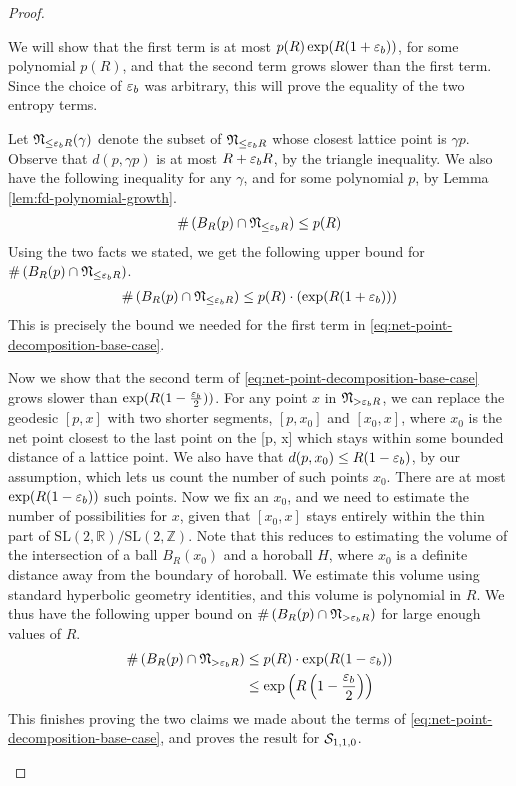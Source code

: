 \begin{proof}
\begin{itemize}
    We will show that the first term is at most $p(R) \exp(R(1 + \varepsilon_b))$, for some polynomial $p(R)$, and that the second term grows slower than the first term.
    Since the choice of $\varepsilon_b$ was arbitrary, this will prove the equality of the two entropy terms.

    Let $\mathfrak{N}_{\leq \varepsilon_b R}(\gamma)$ denote the subset of $\mathfrak{N}_{\leq \varepsilon_b R}$ whose closest lattice point is $\gamma p$.
    Observe that $d(p, \gamma p)$ is at most $R + \varepsilon_b R$, by the triangle inequality.
    We also have the following inequality for any $\gamma$, and for some polynomial $p$, by Lemma \ref{lem:fd-polynomial-growth}.
    \begin{align*}
      \#\left( B_R(p) \cap \mathfrak{N}_{\leq \varepsilon_b R} \right) \leq p(R)
    \end{align*}
    Using the two facts we stated, we get the following upper bound for $\#\left( B_R(p) \cap \mathfrak{N}_{\leq \varepsilon_b R} \right)$.
    \begin{align*}
      \#\left( B_R(p) \cap \mathfrak{N}_{\leq \varepsilon_b R} \right) \leq p(R) \cdot \left( \exp(R(1+\varepsilon_b)) \right)
    \end{align*}
    This is precisely the bound we needed for the first term in \eqref{eq:net-point-decomposition-base-case}.

    Now we show that the second term of \eqref{eq:net-point-decomposition-base-case} grows slower than $\exp(R(1- \frac{ \varepsilon_b}{2}))$.
    For any point $x$ in $\mathfrak{N}_{> \varepsilon_b R}$, we can replace the geodesic $[p, x]$ with two shorter segments, $[p, x_0]$ and $[x_0, x]$, where $x_0$ is the net point closest to the last point on the [p, x] which stays within some bounded distance of a lattice point.
    We also have that $d(p, x_0) \leq R(1-\varepsilon_b)$, by our assumption, which lets us count the number of such points $x_0$.
    There are at most $\exp(R(1-\varepsilon_b))$ such points.
    Now we fix an $x_0$, and we need to estimate the number of possibilities for $x$, given that $[x_0, x]$ stays entirely within the thin part of $\mathrm{SL}(2, \mathbb{R})/\mathrm{SL}(2, \mathbb{Z})$.
    Note that this reduces to estimating the volume of the intersection of a ball $B_R(x_0)$ and a horoball $H$, where $x_0$ is a definite distance away from the boundary of horoball.
    We estimate this volume using standard hyperbolic geometry identities, and this volume is polynomial in $R$.
    We thus have the following upper bound on $\#\left( B_R(p) \cap \mathfrak{N}_{> \varepsilon_b R} \right) $ for large enough values of $R$.
    \begin{align*}
      \#\left( B_R(p) \cap \mathfrak{N}_{> \varepsilon_b R} \right)  &\leq p(R) \cdot \exp(R(1-\varepsilon_b)) \\
                                                        &\leq \exp\left(R\left(1 - \frac{\varepsilon_b}{2}\right)\right)
    \end{align*}
    This finishes proving the two claims we made about the terms of \eqref{eq:net-point-decomposition-base-case}, and proves the result for $\mathcal{S}_{1,1,0}$.


\end{itemize}
\end{proof}
